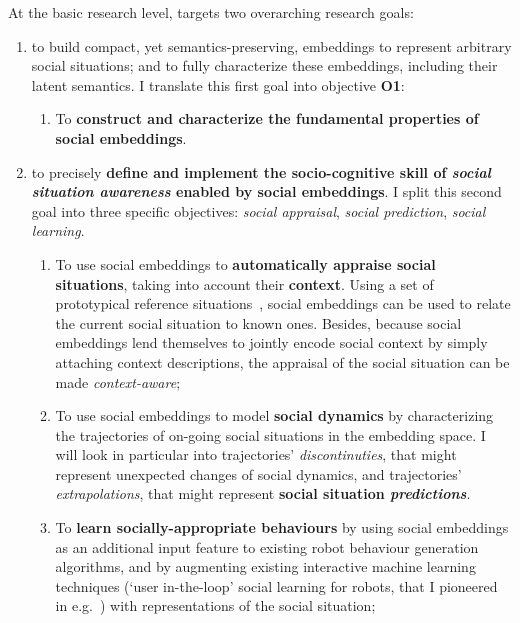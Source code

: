 \begin{rewrite}

\noindent At the basic research level, \project targets two overarching research goals:

\begin{enumerate}[label=\textbf{(\arabic*)}]
    \item to build compact, yet semantics-preserving, embeddings to represent
arbitrary social situations; and to fully characterize these embeddings,
including their latent semantics. I translate this first goal into objective
{\bf O1}:

\begin{enumerate}[label=\textbf{O\arabic*}]
    \item \label{O1} To \textbf{construct and characterize the fundamental
properties of social embeddings}.
\end{enumerate}

    \item to precisely \textbf{define and implement the socio-cognitive skill of
        \emph{social situation awareness} enabled by social embeddings}. I split this
        second goal into three specific objectives: \emph{social appraisal},
        \emph{social prediction}, \emph{social learning}.

\begin{enumerate}[label=\textbf{O2.\arabic*}]
    \item \label{O2.1} To use social embeddings to \textbf{automatically appraise
        social situations}, taking into account their \textbf{context}. Using
        a set of prototypical reference situations~\cite{kelley2003atlas}, social embeddings
        can be used to relate the current social situation to known ones.
        Besides, because social embeddings lend themselves to jointly encode
        social context by simply attaching context descriptions, the appraisal
        of the social situation can be made \emph{context-aware};

    \item \label{O2.2} To use social embeddings to model \textbf{social
        dynamics} by characterizing the trajectories of on-going social situations in the
        embedding space. I will look in particular into trajectories'
        \emph{discontinuties}, that might represent unexpected changes of social
        dynamics, and trajectories' \emph{extrapolations}, that might represent
        \textbf{social situation \emph{predictions}}.

    \item \label{O2.3} To \textbf{learn socially-appropriate behaviours} by using
        social embeddings as an additional input feature to existing robot behaviour
        generation algorithms, and by augmenting existing interactive machine
        learning techniques (`user in-the-loop' social learning for robots, that I
        pioneered in e.g.~\cite{winkle2021leador}) with
        representations of the social situation;


\end{enumerate}
\end{enumerate}
\end{rewrite}
